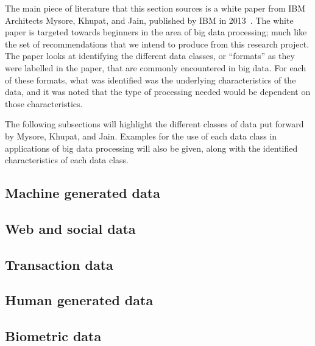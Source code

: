 \documentclass[a4paper,11pt]{article}
\begin{document}
The main piece of literature that this section sources is a white paper from IBM Architects Mysore, Khupat, and Jain,
published by IBM in 2013~\cite{ibm_big_2013}. The white paper is targeted towards beginners in the area of big data
processing; much like the set of recommendations that we intend to produce from this research project. The paper looks
at identifying the different data classes, or ``formats'' as they were labelled in the paper, that are commonly
encountered in big data. For each of these formats, what was identified was the underlying characteristics of the data,
and it was noted that the type of processing needed would be dependent on those characteristics.

The following subsections will highlight the different classes of data put forward by Mysore, Khupat, and Jain.
Examples for the use of each data class in applications of big data processing will also be given, along with the
identified characteristics of each data class.

\subsection{Machine generated data} %
\label{sub:machine_generated_data}




\subsection{Web and social data} %
\label{sub:web_and_social_data}


\subsection{Transaction data} %
\label{sub:transaction_data}


\subsection{Human generated data} %
\label{sub:human_generated_data}


\subsection{Biometric data} %
\label{sub:biometric_data}
\end{document}
